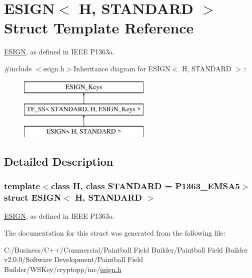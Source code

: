 \hypertarget{struct_e_s_i_g_n}{
\section{ESIGN$<$ H, STANDARD $>$ Struct Template Reference}
\label{struct_e_s_i_g_n}
}


\hyperlink{struct_e_s_i_g_n}{ESIGN}, as defined in IEEE P1363a.  


{\ttfamily \#include $<$esign.h$>$}Inheritance diagram for ESIGN$<$ H, STANDARD $>$::\begin{figure}[H]
\begin{center}
\leavevmode
\includegraphics[height=3cm]{struct_e_s_i_g_n}
\end{center}
\end{figure}


\subsection{Detailed Description}
\subsubsection*{template$<$class H, class STANDARD = P1363\_\-EMSA5$>$ struct ESIGN$<$ H, STANDARD $>$}

\hyperlink{struct_e_s_i_g_n}{ESIGN}, as defined in IEEE P1363a. 

The documentation for this struct was generated from the following file:\begin{DoxyCompactItemize}
\item 
C:/Business/C++/Commercial/Paintball Field Builder/Paintball Field Builder v2.0.0/Software Development/Paintball Field Builder/WSKey/cryptopp/inc/\hyperlink{esign_8h}{esign.h}\end{DoxyCompactItemize}
